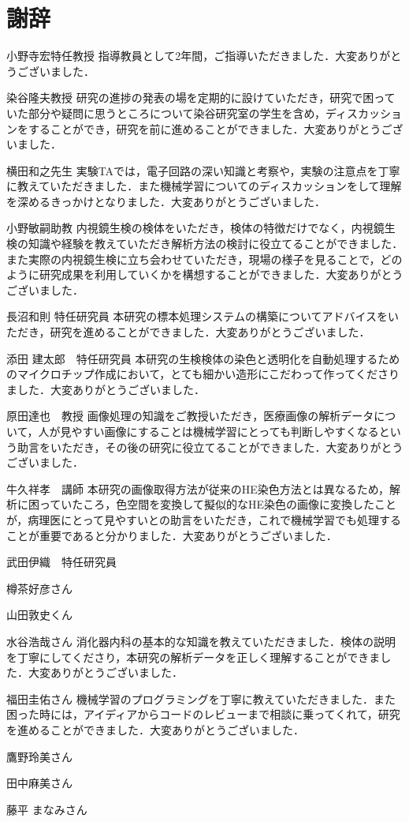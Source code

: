 \chapter*{謝辞}%
%

小野寺宏特任教授
指導教員として2年間，ご指導いただきました．大変ありがとうございました．

染谷隆夫教授
研究の進捗の発表の場を定期的に設けていただき，研究で困っていた部分や疑問に思うところについて染谷研究室の学生を含め，ディスカッションをすることができ，研究を前に進めることができました．大変ありがとうございました．

横田和之先生
実験TAでは，電子回路の深い知識と考察や，実験の注意点を丁寧に教えていただきました．また機械学習についてのディスカッションをして理解を深めるきっかけとなりました．大変ありがとうございました．

小野敏嗣助教
内視鏡生検の検体をいただき，検体の特徴だけでなく，内視鏡生検の知識や経験を教えていただき解析方法の検討に役立てることができました．また実際の内視鏡生検に立ち会わせていただき，現場の様子を見ることで，どのように研究成果を利用していくかを構想することができました．大変ありがとうございました．

長沼和則 特任研究員
本研究の標本処理システムの構築についてアドバイスをいただき，研究を進めることができました．大変ありがとうございました．

添田 建太郎　特任研究員
本研究の生検検体の染色と透明化を自動処理するためのマイクロチップ作成において，とても細かい造形にこだわって作ってくださりました．大変ありがとうございました．

原田達也　教授
画像処理の知識をご教授いただき，医療画像の解析データについて，人が見やすい画像にすることは機械学習にとっても判断しやすくなるという助言をいただき，その後の研究に役立てることができました．大変ありがとうございました．

牛久祥孝　講師
本研究の画像取得方法が従来のHE染色方法とは異なるため，解析に困っていたころ，色空間を変換して擬似的なHE染色の画像に変換したことが，病理医にとって見やすいとの助言をいただき，これで機械学習でも処理することが重要であると分かりました．大変ありがとうございました．

武田伊織　特任研究員

樽茶好彦さん

山田敦史くん

水谷浩哉さん
消化器内科の基本的な知識を教えていただきました．検体の説明を丁寧にしてくださり，本研究の解析データを正しく理解することができました．大変ありがとうございました．

福田圭佑さん
機械学習のプログラミングを丁寧に教えていただきました．また困った時には，アイディアからコードのレビューまで相談に乗ってくれて，研究を進めることができました．大変ありがとうございました．

鷹野玲美さん

田中麻美さん

藤平 まなみさん